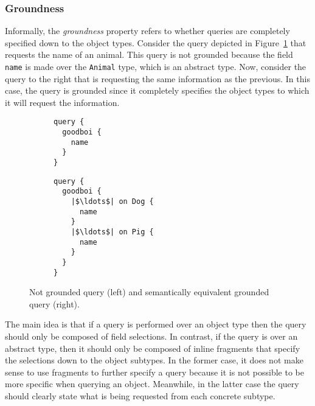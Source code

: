 \subsubsection*{Groundness}

Informally, the \textit{groundness} property refers to whether queries are completely specified down to the object types.  Consider the query depicted in Figure~\ref{fig:grounded} that requests the name of an animal. This query is not grounded because the field \texttt{name} is made over the \texttt{Animal} type, which is an abstract type. Now, consider the query to the right that is requesting the same information as the previous. In this case, the query is grounded since it completely specifies the object types to which it will request the information.

\begin{figure}[h]
\centering
\begin{subfigure}{.25\textwidth}
\begin{verbatim}
query {
  goodboi {
    name
  }
}
\end{verbatim}
\end{subfigure}%
\begin{subfigure}{.25\textwidth}
\begin{verbatim}
query {
  goodboi {
    |$\ldots$| on Dog {
	  name
    }
    |$\ldots$| on Pig {
      name
    }
  }	
}
\end{verbatim} 
\end{subfigure}

\caption{Not grounded query (left) and semantically equivalent grounded query (right).}
\label{fig:grounded}
\end{figure}

The main idea is that if a query is performed over an object type then the query should only be composed of field selections. In contrast, if the query is over an abstract type, then it should only be composed of inline fragments that specify the selections down to the object subtypes. In the former case, it does not make sense to use fragments to further specify a query because it is not possible to be more specific when querying an object. Meanwhile, in the latter case the query should clearly state what is being requested from each concrete subtype.

